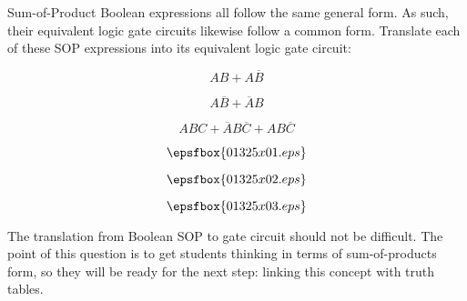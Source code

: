 

Sum-of-Product Boolean expressions all follow the same general form.  As such, their equivalent logic gate circuits likewise follow a common form.  Translate each of these SOP expressions into its equivalent logic gate circuit:

\vskip 10pt

$$AB + A\overline{B}$$

\vskip 10pt

$$A\overline{B} + \overline{A}B$$

\vskip 10pt

$$ABC + \overline{A}B\overline{C} + AB\overline{C}$$

\vskip 10pt







$$\epsfbox{01325x01.eps}$$

\vskip 30pt

$$\epsfbox{01325x02.eps}$$

\vskip 30pt

$$\epsfbox{01325x03.eps}$$







The translation from Boolean SOP to gate circuit should not be difficult.  The point of this question is to get students thinking in terms of sum-of-products form, so they will be ready for the next step: linking this concept with truth tables.




